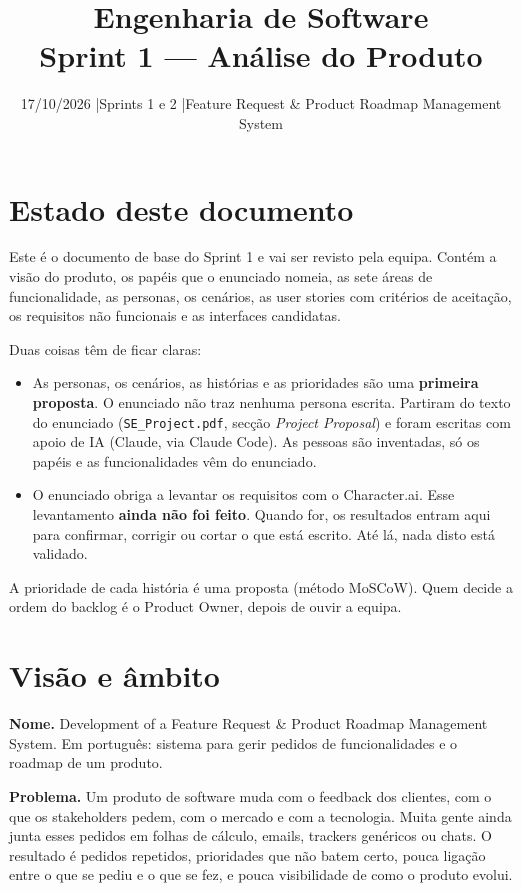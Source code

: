 \documentclass[12pt,a4paper]{article}
\title{Engenharia de Software\\Sprint 1 --- Análise do Produto}
\author{}
\date{17/10/2026 \quad|\quad Sprints 1 e 2 \quad|\quad Feature Request \& Product Roadmap Management System}
\begin{document}
\maketitle

\section*{Estado deste documento}

Este é o documento de base do Sprint 1 e vai ser revisto pela equipa. Contém a visão do produto, os papéis que o enunciado nomeia, as sete áreas de funcionalidade, as personas, os cenários, as user stories com critérios de aceitação, os requisitos não funcionais e as interfaces candidatas.

Duas coisas têm de ficar claras:

\begin{itemize}
\item As personas, os cenários, as histórias e as prioridades são uma \textbf{primeira proposta}. O enunciado não traz nenhuma persona escrita. Partiram do texto do enunciado (\texttt{SE\_Project.pdf}, secção \textit{Project Proposal}) e foram escritas com apoio de IA (Claude, via Claude Code). As pessoas são inventadas, só os papéis e as funcionalidades vêm do enunciado.
\item O enunciado obriga a levantar os requisitos com o Character.ai. Esse levantamento \textbf{ainda não foi feito}. Quando for, os resultados entram aqui para confirmar, corrigir ou cortar o que está escrito. Até lá, nada disto está validado.
\end{itemize}

A prioridade de cada história é uma proposta (método MoSCoW). Quem decide a ordem do backlog é o Product Owner, depois de ouvir a equipa.

\section{Visão e âmbito}

\textbf{Nome.} Development of a Feature Request \& Product Roadmap Management System. Em português: sistema para gerir pedidos de funcionalidades e o roadmap de um produto.

\textbf{Problema.} Um produto de software muda com o feedback dos clientes, com o que os stakeholders pedem, com o mercado e com a tecnologia. Muita gente ainda junta esses pedidos em folhas de cálculo, emails, trackers genéricos ou chats. O resultado é pedidos repetidos, prioridades que não batem certo, pouca ligação entre o que se pediu e o que se fez, e pouca visibilidade de como o produto evolui.
\end{document}
